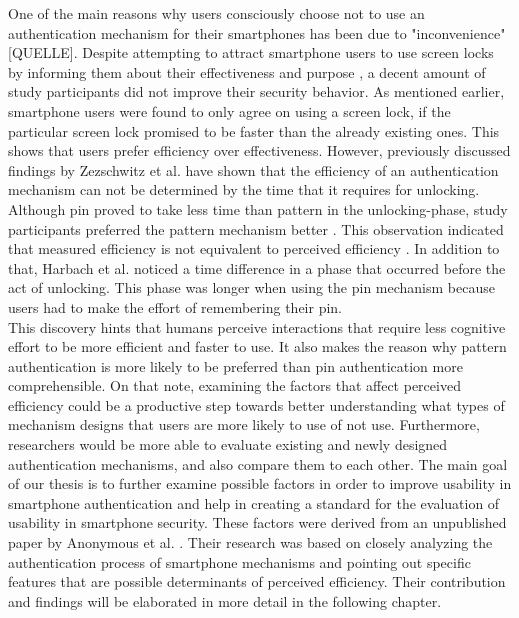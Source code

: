 One of the main reasons why users consciously choose not to use an authentication mechanism for their smartphones has been due to "inconvenience" [QUELLE]. Despite attempting to attract smartphone users to use screen locks by informing them about their effectiveness and purpose \cite{Albayram:2017:BUL:3235924.3235929}, a decent amount of study participants did not improve their security behavior. As mentioned earlier, smartphone users were found to only agree on using a screen lock, if the particular screen lock promised to be faster than the already existing ones. This shows that users prefer efficiency over effectiveness. However, previously discussed findings by Zezschwitz et al. \cite{PatternWild} have shown that the efficiency of an authentication mechanism can not be determined by the time that it requires for unlocking. Although pin proved to take less time than pattern in the unlocking-phase, study participants preferred the pattern mechanism better \cite{PatternWild}. This observation indicated that measured efficiency is not equivalent to perceived efficiency \cite{anonymous}. In addition to that, Harbach et al. \cite{AnatomySmartphone} noticed a time difference in a phase that occurred before the act of unlocking. This phase was longer when using the pin mechanism because users had to make the effort of remembering their pin.\\ 

This discovery hints that humans perceive interactions that require less cognitive effort to be more efficient and faster to use. It also makes the reason why pattern authentication is more likely to be preferred than pin authentication more comprehensible. On that note, examining the factors that affect perceived efficiency could be a productive step towards better understanding what types of mechanism designs that users are more likely to use of not use.
Furthermore, researchers would be more able to evaluate existing and newly designed authentication mechanisms, and also compare them to each other. The main goal of our thesis is to further examine possible factors in order to improve usability in smartphone authentication and help in creating a standard for the evaluation of usability in smartphone security. These factors were derived from an unpublished paper by Anonymous et al. \cite{anonymous}. Their research was based on closely analyzing the authentication process of smartphone mechanisms and pointing out specific features that are possible determinants of perceived efficiency. Their contribution and findings will be elaborated in more detail in the following chapter. 











